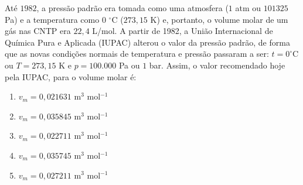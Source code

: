 Até $1982$, a pressão padrão era tomada como uma atmosfera ($1$ atm ou $101325$ Pa) e a temperatura como $0$ $^\circ$C ($273,15$ K) e, portanto, o volume molar de um gás nas CNTP era $22,4$ L/mol.
A partir de 1982, a União Internacional de Química Pura e Aplicada (IUPAC) alterou o valor da pressão padrão, de forma que as novas condições normais de temperatura e pressão passaram a ser:
$t = 0 ^\circ$C ou $T = 273,15$ K e $p = 100.000$ Pa ou $1$ bar.
Assim, o valor recomendado hoje pela IUPAC, para o volume molar é:

\begin{enumerate}[label = (\alph*)]
	\item $v_m = 0,021631$ m$^3$ mol$^{-1}$
	\item $v_m = 0,035845$ m$^3$ mol$^{-1}$
	\item $v_m = 0,022711$ m$^3$ mol$^{-1}$
	\item $v_m = 0,035745$ m$^3$ mol$^{-1}$
	\item $v_m = 0,027211$ m$^3$ mol$^{-1}$
\end{enumerate}
